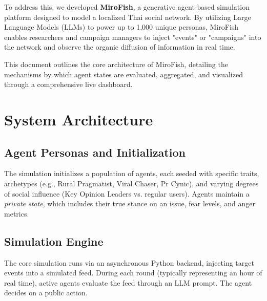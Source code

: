 \documentclass[conference]{IEEEtran}
\begin{document}
To address this, we developed \textbf{MiroFish}, a generative agent-based simulation platform designed to model a localized Thai social network. By utilizing Large Language Models (LLMs) to power up to 1,000 unique personas, MiroFish enables researchers and campaign managers to inject "events" or "campaigns" into the network and observe the organic diffusion of information in real time. 

This document outlines the core architecture of MiroFish, detailing the mechanisms by which agent states are evaluated, aggregated, and visualized through a comprehensive live dashboard.

\section{System Architecture}

\subsection{Agent Personas and Initialization}
The simulation initializes a population of agents, each seeded with specific traits, archetypes (e.g., Rural Pragmatist, Viral Chaser, Pr Cynic), and varying degrees of social influence (Key Opinion Leaders vs. regular users). Agents maintain a \textit{private state}, which includes their true stance on an issue, fear levels, and anger metrics. 

\subsection{Simulation Engine}
The core simulation runs via an asynchronous Python backend, injecting target events into a simulated feed. During each round (typically representing an hour of real time), active agents evaluate the feed through an LLM prompt. The agent decides on a public action.
\end{document}
